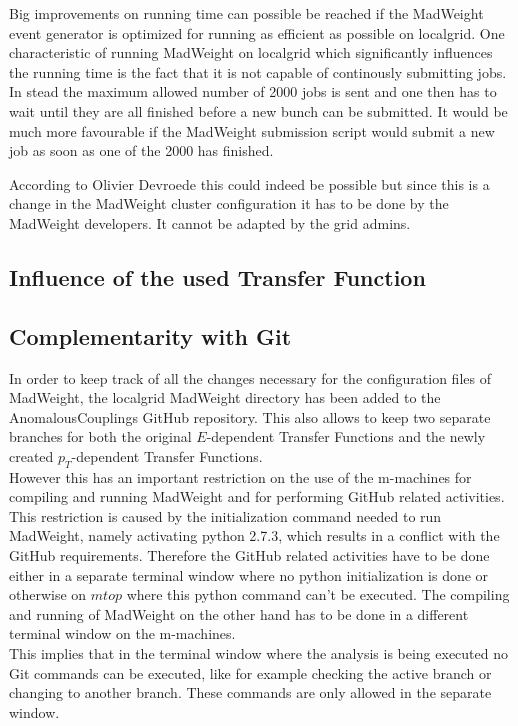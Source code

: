 Big improvements on running time can possible be reached if the MadWeight event generator is optimized for running as efficient as possible on localgrid. One characteristic of running MadWeight on localgrid which significantly influences the running time is the fact that it is not capable of continously submitting jobs. In stead the maximum allowed number of 2000 jobs is sent and one then has to wait until they are all finished before a new bunch can be submitted. It would be much more favourable if the MadWeight submission script would submit a new job as soon as one of the 2000 has finished.

According to Olivier Devroede this could indeed be possible but since this is a change in the MadWeight cluster configuration it has to be done by the MadWeight developers. It cannot be adapted by the grid admins.

\subsection{Influence of the used Transfer Function}

\subsection{Complementarity with Git}\label{sec::GitIssues}
In order to keep track of all the changes necessary for the configuration files of MadWeight, the localgrid MadWeight directory has been added to the AnomalousCouplings GitHub repository. This also allows to keep two separate branches for both the original $E$-dependent Transfer Functions and the newly created $p_{T}$-dependent Transfer Functions. \\
However this has an important restriction on the use of the m-machines for compiling and running MadWeight and for performing GitHub related activities. This restriction is caused by the initialization command needed to run MadWeight, namely activating python 2.7.3, which results in a conflict with the GitHub requirements. Therefore the GitHub related activities have to be done either in a separate terminal window where no python initialization is done or otherwise on $mtop$ where this python command can't be executed. The compiling and running of MadWeight on the other hand has to be done in a different terminal window on the m-machines.\\
This implies that in the terminal window where the analysis is being executed no Git commands can be executed, like for example checking the active branch or changing to another branch. These commands are only allowed in the separate window. 

